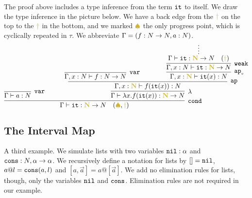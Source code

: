 \documentclass{article}
\begin{document}
The proof above includes a type inference from the term ${\tt it}$ to itself.
We draw the type inference in the picture below. 
We have a back edge from the 
$\bfColor{oldgold}{\dagger}$ on the top to the $\bfColor{oldgold}{\dagger}$ in the bottom,
and we marked $\bfColor{oldgold}{ \spadesuit}$ the only progress point, which is cyclically repeated
in $\tau$.
We abbreviate $\Gamma = (f:{N} \rightarrow {N}, a:{N})$.
\[
{
    \infer[\cond]{ %
      \Gamma 
      \vdash \iter: \bfColor{oldgold}{\N} \rightarrow \N 
        \quad (\bfColor{oldgold}{ \spadesuit}, \bfColor{oldgold}{\dagger})
     }{ 
         \infer[\var]{
       \Gamma 
      \vdash a:\N}{}
     &
        {\ \ \ \ \ \ }
        {\infer[\lambda] %
         {
         \Gamma
          \vdash \lambda x.f(\iter(x)):\bfColor{oldgold}{\N} \rightarrow \N
         }{
         \infer[\ap]{ %
           \Gamma, x:\bfColor{oldgold}{\N}
          \vdash f(\iter(x)):\N
           }{
          \infer[\var]{
       \Gamma, x:\N 
      \vdash f:\N \rightarrow \N}{}
           {\ \ \ \ \ \ \ \ \ \ \ \ }
           {\infer[\apvar] %
            {\Gamma, x:\bfColor{oldgold}{\N}
        \vdash \iter(x): \N 
             }{
          \infer[\weak]{\Gamma, x:\N
                                 \vdash \iter: \bfColor{oldgold}{\N} \rightarrow \N}
                                {\infer*{\Gamma
                                 \vdash \iter: \bfColor{oldgold}{\N} \rightarrow \N
                                  \ \ \ (\bfColor{oldgold}{ \dagger})}{}
             }
           }
          }
        }%
      }%
    }%
   }%
 }%
\]




\subsection{The Interval Map}
A third example. We simulate lists with two variables ${\tt nil}:\alpha$ and 
${\tt cons}:{N},\alpha \rightarrow \alpha$. We recursively define a notation for lists by $[]={\tt nil}$,
$a @ l={\tt cons}(a,l)$ and $[a,\vec{a}] = a @ [\vec{a}]$. We add no elimination rules for lists, though,
only the variables ${\tt nil}$ and ${\tt cons}$. Elimination rules are not required in our example.
\end{document}
